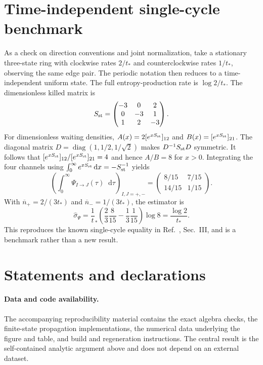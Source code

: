 \documentclass[11pt,a4paper]{article}
\newcommand{\dd}{\mathop{}\!\mathrm{d}}
\newcommand{\ts}{t_*}
\newcommand{\sigw}{\widehat{\sigma}_{\Psi}}
\DeclareMathOperator{\diag}{diag}
\begin{document}
\section{Time-independent single-cycle benchmark}
\label{app:baseline}
As a check on direction conventions and joint normalization, take a stationary three-state ring with clockwise rates $2/\ts$ and counterclockwise rates $1/\ts$, observing the same edge pair. The periodic notation then reduces to a time-independent uniform state. The full entropy-production rate is $\log2/\ts$. The dimensionless killed matrix is
\begin{equation}
 S_{\rm st}=\begin{pmatrix}-3&0&2\\0&-3&1\\1&2&-3\end{pmatrix}.
\end{equation}
For dimensionless waiting densities, $A(x)=2[e^{xS_{\rm st}}]_{12}$ and $B(x)=[e^{xS_{\rm st}}]_{21}$. The diagonal matrix $D=\diag(1,1/2,1/\sqrt2)$ makes $D^{-1}S_{\rm st}D$ symmetric. It follows that $[e^{xS_{\rm st}}]_{12}/[e^{xS_{\rm st}}]_{21}=4$ and hence $A/B=8$ for $x>0$. Integrating the four channels using $\int_0^\infty e^{xS_{\rm st}}\dd x=-S_{\rm st}^{-1}$ yields
\begin{equation}
 \left(\int_0^\infty\Psi_{I\to J}(\tau)\dd\tau\right)_{I,J=+,-}
 =\begin{pmatrix}8/15&7/15\\14/15&1/15\end{pmatrix}.
 \label{eq:benchmark}
\end{equation}
With $\overline n_+=2/(3\ts)$ and $\overline n_-=1/(3\ts)$, the estimator is
\begin{equation}
 \sigw=\frac1\ts\left(\frac23\frac8{15}-\frac13\frac1{15}\right)\log8
 =\frac{\log2}{\ts}.
\end{equation}
This reproduces the known single-cycle equality in Ref.~\cite{vanderMeer2022}, Sec.~III, and is a benchmark rather than a new result.

\section*{Statements and declarations}
\paragraph{Data and code availability.}
The accompanying reproducibility material contains the exact algebra checks, the finite-state propagation implementations, the numerical data underlying the figure and table, and build and regeneration instructions. The central result is the self-contained analytic argument above and does not depend on an external dataset.
\end{document}

